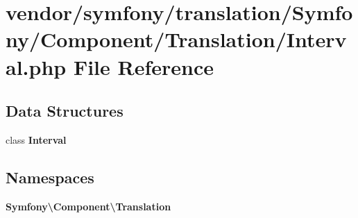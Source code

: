 \section{vendor/symfony/translation/\+Symfony/\+Component/\+Translation/\+Interval.php File Reference}
\label{_interval_8php}
\subsection*{Data Structures}
\begin{DoxyCompactItemize}
\item 
class {\bf Interval}
\end{DoxyCompactItemize}
\subsection*{Namespaces}
\begin{DoxyCompactItemize}
\item 
 {\bf Symfony\textbackslash{}\+Component\textbackslash{}\+Translation}
\end{DoxyCompactItemize}
